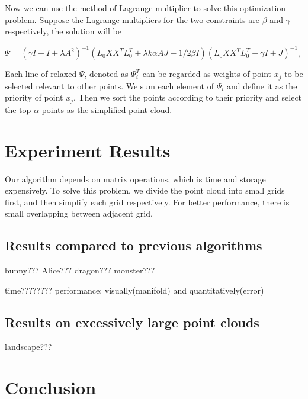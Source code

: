 \documentclass[10pt,conference,a4paper]{IEEEtran}
\begin{document}
Now we can use the method of Lagrange multiplier to solve this 
optimization problem. Suppose the Lagrange multipliers for the two 
constraints are $\beta$ and $\gamma$ respectively, the solution will 
be
\begin{center}
$\Psi=(\gamma I+I+\lambda A^2)^{-1}(L_0XX^TL_0^T+\lambda k\alpha AJ-
1/2 \beta I)(L_0XX^TL_0^T+\gamma I+J)^{-1}$,
\end{center}

Each line of relaxed $\Psi$, denoted as $\Psi_i^T$ can be regarded as 
weights of point $x_j$ to be selected relevant to other points. We 
sum each element of $\Psi_i$ and define it as the priority of point $x_j$.
Then we sort the points according to their priority and select the top 
$\alpha$ points as the simplified point cloud.



\section{Experiment Results}

Our algorithm depends on matrix operations, which is time and storage 
expensively. To solve this problem, we divide the point cloud into 
small grids first, and then simplify each grid respectively. For better 
performance, there is small overlapping between adjacent grid.

\subsection{Results compared to previous algorithms}

bunny???
Alice???
dragon???
monster???

time????????
performance: visually(manifold) and quantitatively(error)

\subsection{Results on excessively large point clouds}

landscape???

\section{Conclusion}
\end{document}
